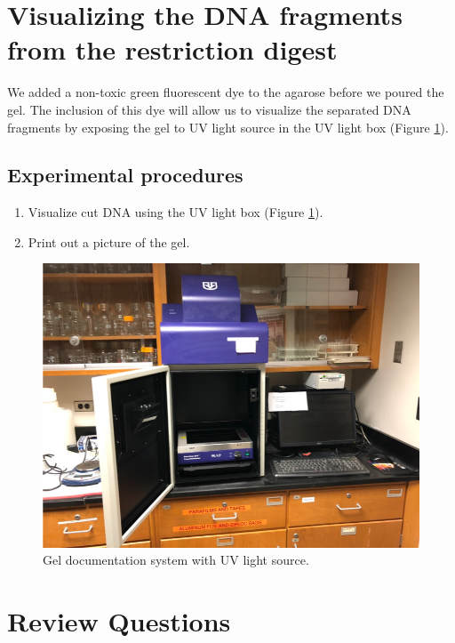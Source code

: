 \section{Visualizing the DNA fragments from the restriction
digest}\label{visualizing-the-dna-fragments-from-the-restriction-digest}

We added a non-toxic green fluorescent dye to the agarose before we
poured the gel. The inclusion of this dye will allow us to visualize the
separated DNA fragments by exposing the gel to UV light source in the UV
light box (Figure \ref{fig:doc}).

\subsection{Experimental procedures}\label{experimental-procedures-31}

\begin{enumerate}
\def\labelenumi{\arabic{enumi}.}
\tightlist
\item
  Visualize cut DNA using the UV light box (Figure \ref{fig:doc}).
\item
  Print out a picture of the gel.
\end{enumerate}

\begin{figure}

{\centering \includegraphics[width=0.7\linewidth]{./figures/molbio/Gel_doc}

}

\caption{Gel documentation system with UV light source.}\label{fig:doc}
\end{figure}

\section{Review Questions}\label{review-questions-8}

